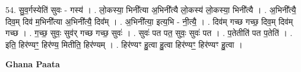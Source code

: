 \documentclass[17pt]{extarticle}
\begin{document}
54. सु॒व॒र्गस्येति॑ सुवः - गस्य॑ । . लो॒कस्या॒ भिनी᳚त्या अ॒भिनी᳚त्यै लो॒कस्य॑ लो॒कस्या॒ भिनी᳚त्यै । . अ॒भिनी᳚त्यै॒ दिव॒म् दिव॑ म॒भिनी᳚त्या अ॒भिनी᳚त्यै॒ दिव᳚म् । . अ॒भिनी᳚त्या॒ इत्य॒भि - नी॒त्यै॒ । . दिव॑म् गच्छ गच्छ॒ दिव॒म् दिव॑म् गच्छ । . ग॒च्छ॒ सुवः॒ सुव॑र् गच्छ गच्छ॒ सुवः॑ । . सुवः॑ पत पत॒ सुवः॒ सुवः॑ पत । . प॒तेतीति॑ पत प॒तेति॑ । . इति॒ हिर॑ण्यꣳ॒॒ हिर॑ण्य॒ मितीति॒ हिर॑ण्यम् । . हिर॑ण्यꣳ हु॒त्वा हु॒त्वा हिर॑ण्यꣳ॒॒ हिर॑ण्यꣳ हु॒त्वा । \newline

\textbf{Ghana Paata } \newline
\end{document}
